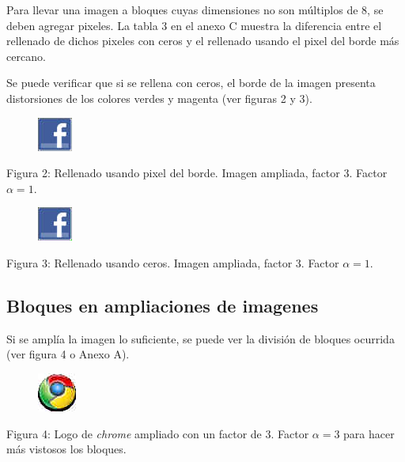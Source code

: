 \documentclass[%
final,
%
reprint,
%
notitlepage,
narroweqnarray,
inline,
twoside,
invited
]{ieee}
\begin{document}
Para llevar una imagen a bloques cuyas dimensiones no son múltiplos de 8, se deben agregar pixeles. La 
tabla 3 en el anexo C muestra la diferencia entre el rellenado de dichos pixeles con ceros y el rellenado usando 
el pixel del borde más cercano.


\par Se puede verificar que si se rellena con ceros, el borde de la imagen presenta distorsiones de los 
colores verdes y magenta (ver figuras 2 y 3).

\begin{figure}[H]
	\begin{center}
	\includegraphics[scale=3]{./img/facebookout.png}
	\end{center}
\end{figure}
\begin{center}
\par Figura 2: Rellenado usando pixel del borde. Imagen ampliada, factor 3. Factor $\alpha=1$.
\end{center}

\begin{figure}[H]
	\begin{center}
	\includegraphics[scale=3]{./img/facebookout0.png}
	\end{center}
\end{figure}
\begin{center}
\par Figura 3: Rellenado usando ceros. Imagen ampliada, factor 3. Factor $\alpha=1$.
\end{center}

\subsection{Bloques en ampliaciones de imagenes}

Si se amplía la imagen lo suficiente, se puede ver la división de bloques ocurrida (ver figura 4 o Anexo A).

\begin{figure}[H]
	\begin{center}
	\includegraphics[scale=3]{./img/chrome3out.png}
	\end{center}
\end{figure}
\begin{center}
\par Figura 4: Logo de \textit{chrome} ampliado con un factor de 3. Factor $\alpha=3$ para hacer más vistosos los bloques.
\end{center}
\end{document}
